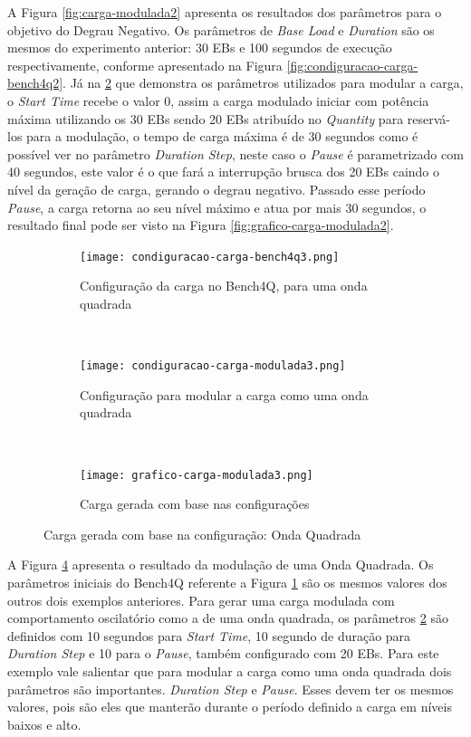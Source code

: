A Figura \ref{fig:carga-modulada2} apresenta os resultados dos parâmetros para o objetivo do Degrau Negativo. Os parâmetros de \textit{Base Load} e \textit{Duration} são os mesmos do experimento anterior: 30 EBs e 100 segundos de execução respectivamente, conforme apresentado na Figura \ref{fig:condiguracao-carga-bench4q2}. Já na \ref{fig:condiguracao-carga-modulada3} que demonstra os parâmetros utilizados para modular a carga, o \textit{Start Time} recebe o valor 0, assim a carga modulado iniciar com potência máxima utilizando os 30 EBs sendo 20 EBs atribuído no \textit{Quantity} para reservá-los para a modulação, o tempo de carga máxima é de 30 segundos como é possível ver no parâmetro \textit{Duration Step}, neste caso o \textit{Pause} é parametrizado com 40 segundos, este valor é o que fará a interrupção brusca dos 20 EBs caindo o nível da geração de carga, gerando o degrau negativo. Passado esse período \textit{Pause}, a carga retorna ao seu nível máximo e atua por mais 30 segundos, o resultado final pode ser visto na Figura \ref{fig:grafico-carga-modulada2}. 

\begin{figure}[!htb]
	\begin{subfigure}{\linewidth}
		\centering
		\texttt{[image: condiguracao-carga-bench4q3.png]}
		\caption{Configuração da carga no Bench4Q, para uma onda quadrada}
		\label{fig:condiguracao-carga-bench4q3}
	\end{subfigure}\\
	\begin{subfigure}{\linewidth}
		\centering
		\texttt{[image: condiguracao-carga-modulada3.png]}
		\caption{Configuração para modular a carga como uma onda quadrada}
		\label{fig:condiguracao-carga-modulada3}
	\end{subfigure}\\[1ex]
	\begin{subfigure}{\linewidth}
		\centering
		\texttt{[image: grafico-carga-modulada3.png]}
		\caption{Carga gerada com base nas configurações}
		\label{fig:grafico-carga-modulada3}
	\end{subfigure}
	\caption{Carga gerada com base na configuração: Onda Quadrada}
	\label{fig:carga-modulada3}
	\fautor
\end{figure}

A Figura \ref{fig:carga-modulada3} apresenta o resultado da modulação de uma Onda Quadrada. Os parâmetros iniciais do Bench4Q referente a Figura \ref{fig:condiguracao-carga-bench4q3} são os mesmos valores dos outros dois exemplos anteriores. Para gerar uma carga modulada com comportamento oscilatório como a de uma onda quadrada, os parâmetros \ref{fig:condiguracao-carga-modulada3} são definidos com 10 segundos para \textit{Start Time}, 10 segundo de duração para \textit{Duration Step} e 10 para o \textit{Pause}, também configurado com 20 EBs. Para este exemplo vale salientar que para modular a carga como uma onda quadrada dois parâmetros são importantes. \textit{Duration Step} e \textit{Pause}. Esses devem ter os mesmos valores, pois são eles que manterão durante o período definido a carga em níveis baixos e alto. 

